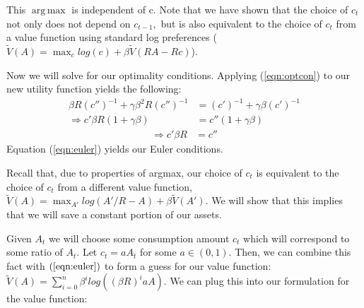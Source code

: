 \documentclass[11pt]{article} %
\DeclareMathOperator*{\argmax}{arg\,max}
\begin{document}
 This $\argmax$ is independent of c. Note that we have shown that the choice of $c_t$ not only does not depend on $c_{t-1},$ but is also equivalent to the choice of $c_t$ from a value function using standard log preferences ($\tilde{V}(A) = \max_{c} log(c) + \beta \tilde{V}(RA-Rc)$).


Now we will solve for our optimality conditions. Applying (\ref{eqn:optcon}) to our new utility function yields the following:
\begin{align*}
\beta R (c'')^{-1} + \gamma \beta^2 R (c'')^{-1}&=(c')^{-1} + \gamma \beta (c')^{-1}\\
\Rightarrow c' \beta R (1+\gamma \beta) &= c''(1+\gamma \beta)
\end{align*}
\begin{align}
\Rightarrow c'\beta R &= c'' \label{eqn:euler}
\end{align}
Equation (\ref{eqn:euler}) yields our Euler conditions.

Recall that, due to properties of argmax, our choice of $c_t$ is equivalent to the choice of $c_t$ from a different value function, $\tilde{V}(A) = \max_{A'} log(A'/R- A) + \beta \tilde{V}(A')$. We will show that this implies that we will save a constant portion of our assets.

Given $A_t$ we will choose some consumption amount $c_t$ which will correspond to some ratio of $A_t$. Let $c_t = aA_t$ for some $a \in (0,1)$. Then, we can combine this fact with $(\ref{eqn:euler})$ to form a guess for our value function: $\tilde{V}(A) = \sum_{i=0}^n \beta^i log((\beta R)^iaA)$. We can plug this into our formulation for the value function:
\end{document}
